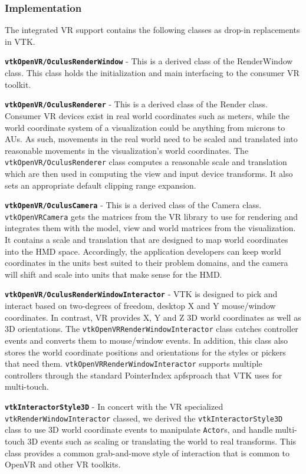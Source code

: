 \subsubsection{Implementation}

The integrated VR support contains the following classes as drop-in replacements in VTK.

\textbf{\texttt{vtkOpenVR/OculusRenderWindow}} - This is a derived class of the RenderWindow class.
This class holds the initialization and main interfacing to the consumer VR toolkit. 

\textbf{\texttt{vtkOpenVR/OculusRenderer}} - This is a derived class of the Render class.
Consumer VR devices exist in real world coordinates such as meters, while the world coordinate system of a visualization could be anything from microns to AUs. As such, movements in the real world need to be scaled and translated into reasonable movements in the visualization's world coordinates. The \texttt{vtkOpenVR/OculusRenderer} class computes a reasonable scale and translation which are then used in computing the view and input device transforms. 
It also sets an appropriate default clipping range expansion.

\textbf{\texttt{vtkOpenVR/OculusCamera}} - This is a derived class of the Camera class. \texttt{vtkOpenVRCamera} gets the matrices from the VR library to use for rendering and integrates them with the model, view and world matrices from the visualization. It contains a scale and translation that are designed to map world coordinates into the HMD space.
Accordingly, the application developers can keep world coordinates in the units best suited to their problem domains, and the camera will shift and scale into units that make sense for the HMD.

\textbf{\texttt{vtkOpenVR/OculusRenderWindowInteractor}} - VTK is designed to pick and interact based on two-degrees of freedom, desktop X and Y mouse/window coordinates.
In contrast, VR provides X, Y and Z 3D world coordinates as well as 3D orientations.
The \texttt{vtkOpenVRRenderWindowInteractor} class catches controller events and converts them to mouse/window events.
In addition, this class also stores the world coordinate positions and orientations for the styles or pickers that need them.
\texttt{vtkOpenVRRenderWindowInteractor} supports multiple controllers through the standard PointerIndex apfsproach that VTK uses for multi-touch.

\textbf{\texttt{vtkInteractorStyle3D}} - In concert with the VR specialized \texttt{vtkRenderWindowInteractor} classed, we derived the \texttt{vtkInteractorStyle3D} class
to use 3D world coordinate events to manipulate \texttt{Actor}s, and handle multi-touch 3D events such as scaling or translating the world to real transforms.
This class provides a common grab-and-move style of interaction that is common to OpenVR and other VR toolkits.

